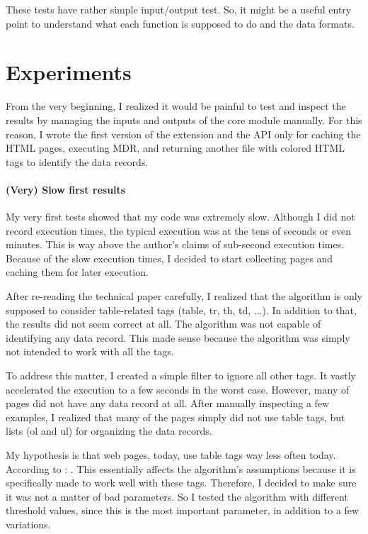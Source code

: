 \documentclass[10pt]{article}
\begin{document}
These tests have rather simple input/output test. So, it might be a useful entry point to understand what each function is supposed to do and the data formats. 



\section{Experiments}

From the very beginning, I realized it would be painful to test and inspect the results by managing the inputs and outputs of the core module manually. For this reason, I wrote the first version of the extension and the API only for caching the HTML pages, executing MDR, and returning another file with colored HTML tags to identify the data records.

\paragraph{(Very) Slow first results} 

My very first tests showed that my code was extremely slow. Although I did not record execution times, the typical execution was at the tens of seconds or even minutes. This is way above the author's claims of sub-second execution times. Because of the slow execution times, I decided to start collecting pages and caching them for later execution. 

After re-reading the technical paper carefully, I realized that the algorithm is only supposed to consider table-related tags (table, tr, th, td, ...). In addition to that, the results did not seem correct at all. The algorithm was not capable of identifying any data record. This made sense because the algorithm was simply not intended to work with all the tags. 

To address this matter, I created a simple filter to ignore all other tags. It vastly accelerated the execution to a few seconds in the worst case. However, many of pages did not have any data record at all. After manually inspecting a few examples, I realized that many of the pages simply did not use table tags, but lists (ol and ul) for organizing the data records. 

My hypothesis is that web pages, today, use table tags way less often today. According to \cite{tables-basics}: . This essentially affects the algorithm's assumptions because it is specifically made to work well with these tags. Therefore, I decided to make sure it was not a matter of bad parameters. So I tested the algorithm with different threshold values, since this is the most important parameter, in addition to a few variations. 
\end{document}
